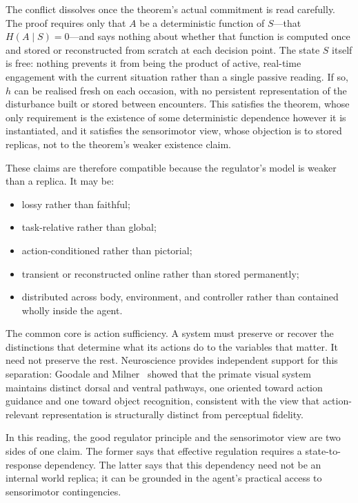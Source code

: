 \documentclass[11pt]{article}
\theoremstyle{remark}
\newcommand{\1}{\mathbb 1}
\begin{document}
The conflict dissolves once the theorem's actual commitment is read carefully. The proof requires only that $A$ be a deterministic function of $S$---that $H(A\mid S)=0$---and says nothing about whether that function is computed once and stored or reconstructed from scratch at each decision point. The state $S$ itself is free: nothing prevents it from being the product of active, real-time engagement with the current situation rather than a single passive reading. If so, $h$ can be realised fresh on each occasion, with no persistent representation of the disturbance built or stored between encounters. This satisfies the theorem, whose only requirement is the existence of some deterministic dependence however it is instantiated, and it satisfies the sensorimotor view, whose objection is to stored replicas, not to the theorem's weaker existence claim.

These claims are therefore compatible because the regulator's model is weaker than a replica. It may be:
\begin{itemize}[leftmargin=*]
\item lossy rather than faithful;
\item task-relative rather than global;
\item action-conditioned rather than pictorial;
\item transient or reconstructed online rather than stored permanently;
\item distributed across body, environment, and controller rather than contained wholly inside the agent.
\end{itemize}

The common core is action sufficiency. A system must preserve or recover the distinctions that determine what its actions do to the variables that matter. It need not preserve the rest. Neuroscience provides independent support for this separation: Goodale and Milner~\citep{Goodale-separate92} showed that the primate visual system maintains distinct dorsal and ventral pathways, one oriented toward action guidance and one toward object recognition, consistent with the view that action-relevant representation is structurally distinct from perceptual fidelity.

In this reading, the good regulator principle and the sensorimotor view are two sides of one claim. The former says that effective regulation requires a state-to-response dependency. The latter says that this dependency need not be an internal world replica; it can be grounded in the agent's practical access to sensorimotor contingencies.
\end{document}
